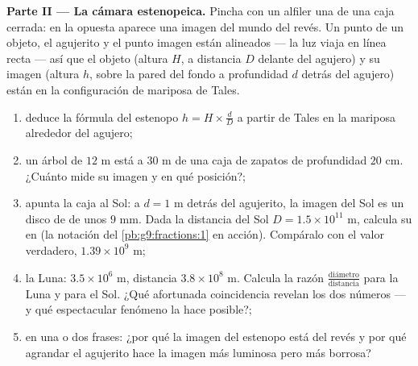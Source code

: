 \begin{problem}
\medskip
\noindent\textbf{Parte II --- La cámara estenopeica.}
Pincha con un alfiler una  de una caja cerrada: en la 
opuesta aparece una imagen del mundo del revés. Un punto de un
objeto, el agujerito y el punto imagen están alineados --- la luz
viaja en línea recta --- así que el objeto (altura $H$, a distancia $D$
delante del agujero) y su imagen (altura $h$, sobre la pared
del fondo a profundidad $d$ detrás del agujero) están en la configuración
de mariposa de Tales.
\begin{enumerate}[resume]
  \item deduce la fórmula del estenopo
        $h = H \times \frac dD$ a partir de Tales en la mariposa
        alrededor del agujero;
  \item un árbol de $12$ m está a $30$ m de una caja de zapatos de profundidad
        $20$ cm. ¿Cuánto mide su imagen y en qué posición?;
  \item apunta la caja al Sol: a $d = 1$ m detrás del
        agujerito, la imagen del Sol es un disco de  de unos
        $9$ mm. Dada la distancia del Sol
        $D = 1.5 \times 10^{11}$ m, calcula su  en
         (la notación del
        \cref{pb:g9:fractions:1} en acción). Compáralo con el valor verdadero,
        $1.39 \times 10^9$ m;
  \item la Luna:  $3.5 \times 10^6$ m, distancia
        $3.8 \times 10^8$ m. Calcula la razón
        $\frac{\text{diámetro}}{\text{distancia}}$ para la Luna
        y para el Sol. ¿Qué afortunada coincidencia revelan los dos
        números --- y qué espectacular fenómeno la
        hace posible?;
  \item en una o dos frases: ¿por qué la imagen del estenopo está
        del revés y por qué agrandar el agujerito hace la
        imagen más luminosa pero más borrosa?
\end{enumerate}


\end{problem}

